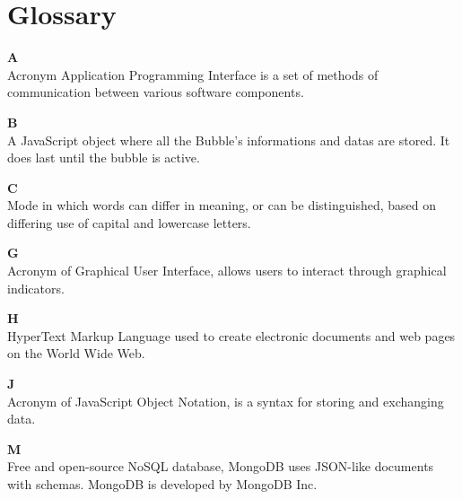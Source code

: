 \section{Glossary}

\textbf{\huge{A}}\\
Acronym Application Programming Interface is a set of methods of communication between various software components.

\textbf{\huge{B}}\\
A JavaScript object where all the Bubble's informations and datas are stored. It does last until the bubble is active.

\textbf{\huge{C}}\\
Mode in which words can differ in meaning, or can be distinguished, based on differing use of capital and lowercase letters.

\textbf{\huge{G}}\\
Acronym of Graphical User Interface, allows users to interact through graphical indicators.

\textbf{\huge{H}}\\
HyperText Markup Language used to create electronic documents and web pages on the World Wide Web. 

\textbf{\huge{J}}\\
Acronym of JavaScript Object Notation, is a syntax for storing and exchanging data.

\textbf{\huge{M}}\\
Free and open-source NoSQL database, MongoDB uses JSON-like documents with schemas. MongoDB is developed by MongoDB Inc.
